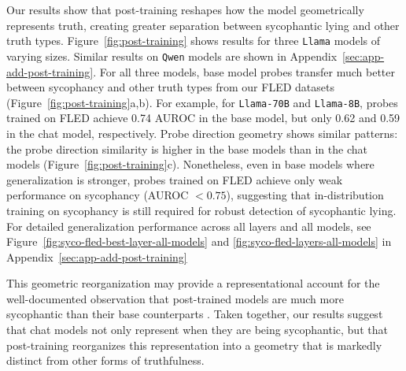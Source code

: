 \documentclass{article}
\theoremstyle{plain}
\theoremstyle{definition}
\theoremstyle{remark}
\begin{document}
Our results show that post-training reshapes how the model geometrically represents truth, creating greater separation between sycophantic lying and other truth types. Figure~\ref{fig:post-training} shows results for three \texttt{Llama} models of varying sizes. Similar results on \texttt{Qwen} models are shown in Appendix~\ref{sec:app-add-post-training}.
For all three models, base model probes transfer much better between sycophancy and other truth types from our FLED datasets (Figure~\ref{fig:post-training}a,b). 
For example, for \texttt{Llama-70B} and \texttt{Llama-8B}, probes trained on FLED achieve 0.74 AUROC in the base model, but only 0.62 and 0.59 in the chat model, respectively.
Probe direction geometry shows similar patterns: the probe direction similarity is higher in the base models than in the chat models (Figure~\ref{fig:post-training}c). Nonetheless, even in base models where generalization is stronger, probes trained on FLED achieve only weak performance on sycophancy (AUROC $<0.75$), suggesting that in-distribution training on sycophancy is still required for robust detection of sycophantic lying. For detailed generalization performance across all layers and all models, see Figure~\ref{fig:syco-fled-best-layer-all-models} and \ref{fig:syco-fled-layers-all-models} in Appendix~\ref{sec:app-add-post-training}

This geometric reorganization may provide a representational account for the well-documented observation that post-trained models are much more sycophantic than their base counterparts \citep{wei2023simple, sharma2024towards}. 
Taken together, our results suggest that chat models not only represent when they are being sycophantic, but that post-training reorganizes this representation into a geometry that is markedly distinct from other forms of truthfulness.
\end{document}

